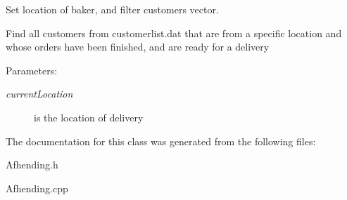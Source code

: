 Set location of baker, and filter customers vector. 

Find all customers from customerlist.dat that are from a specific location and whose orders have been finished, and are ready for a delivery

\begin{Desc}
\item[Parameters:]
\begin{description}
\item[{\em current\-Location}]is the location of delivery \end{description}
\end{Desc}


The documentation for this class was generated from the following files:\begin{CompactItemize}
\item 
Afhending.h\item 
Afhending.cpp\end{CompactItemize}
